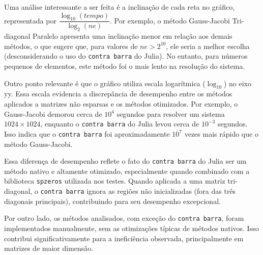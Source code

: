 Uma análise interessante a ser feita é a inclinação de cada reta no gráfico, representada por  $\dfrac{\log_{10}(tempo)}{\log_2(ne)}$. Por exemplo, o método Gauss-Jacobi Tri-diagonal Paralelo apresenta uma inclinação menor em relação aos demais métodos, o que sugere que, para valores de $ne > 2^{10}$, ele seria a melhor escolha (desconsiderando o uso do \texttt{contra barra} do Julia). No entanto, para números pequenos de elementos, este método foi o mais lento na resolução do sistema.

Outro ponto relevante é que o gráfico utiliza escala logarítmica ($\log_{10}$) no eixo yy. Essa escala evidencia a discrepância de desempenho entre os métodos aplicados a matrizes não esparsas e os métodos otimizados. Por exemplo, o Gauss-Jacobi demorou cerca de $10^4$ segundos para resolver um sistema $1024 \times 1024$, enquanto o \texttt{contra barra} do Julia levou cerca de $10^{-3}$ segundos. Isso indica que o \texttt{contra barra} foi aproximadamente $10^7$ vezes mais rápido que o método Gauss-Jacobi.

Essa diferença de desempenho reflete o fato do \texttt{contra barra} do Julia ser um método nativo e altamente otimizado, especialmente quando combinado com a biblioteca \texttt{spzeros} utilizada nos testes. Quando aplicada a uma matriz tri-diagonal, o \texttt{contra barra} ignora as regiões não inicializadas (fora das três diagonais principais), contribuindo para seu desempenho excepcional.

Por outro lado, os métodos analisados, com exceção do \texttt{contra barra}, foram implementados manualmente, sem as otimizações típicas de métodos nativos. Isso contribui significativamente para a ineficiência observada, principalmente em matrizes de maior dimensão.
